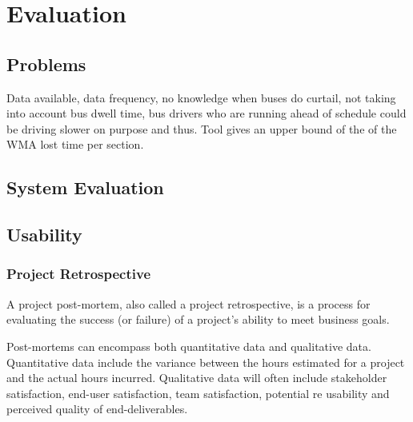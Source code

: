 \chapter{Evaluation}

\section{Problems}
Data available, data frequency, no knowledge when buses do curtail, not taking into account bus dwell time, bus drivers who are running ahead of schedule could be driving slower on purpose and thus. Tool gives an upper bound of the of the WMA lost time per section. 
\section{System Evaluation}

\section{Usability}

\subsection{Project Retrospective}
A project post-mortem, also called a project retrospective, is a process for evaluating the success (or failure) of a project's ability to meet business goals. 

Post-mortems can encompass both quantitative data and qualitative data. Quantitative data include the variance between the hours estimated for a project and the actual hours incurred. Qualitative data will often include stakeholder satisfaction, end-user satisfaction, team satisfaction, potential re usability and perceived quality of end-deliverables.